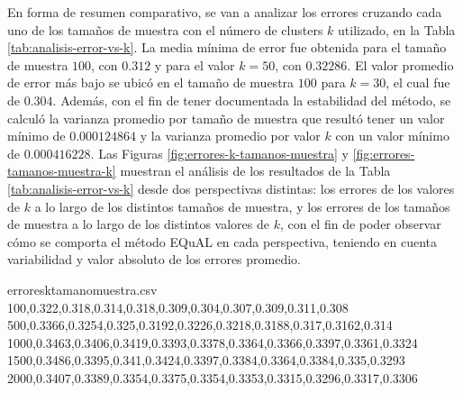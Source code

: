\bigskip En forma de resumen comparativo, se van a analizar los errores cruzando cada uno de los tamaños de muestra con el número de clusters \(k\) utilizado, en la Tabla \ref{tab:analisis-error-vs-k}. La media mínima de error fue obtenida para el tamaño de muestra \(100\), con \(0.312\) y para el valor \(k = 50\), con \(0.32286\). El valor promedio de error más bajo se ubicó en el tamaño de muestra \(100\) para \(k = 30\), el cual fue de \(0.304\). Además, con el fin de tener documentada la estabilidad del método, se calculó la varianza promedio por tamaño de muestra que resultó tener un valor mínimo de \(0.000124864\) y la varianza promedio por valor \(k\) con un valor mínimo de \(0.000416228\). Las Figuras \ref{fig:errores-k-tamanos-muestra} y \ref{fig:errores-tamanos-muestra-k} muestran el análisis de los resultados de la Tabla \ref{tab:analisis-error-vs-k} desde dos perspectivas distintas: los errores de los valores de \(k\) a lo largo de los distintos tamaños de muestra, y los errores de los tamaños de muestra a lo largo de los distintos valores de \(k\), con el fin de poder observar cómo se comporta el método EQuAL en cada perspectiva, teniendo en cuenta variabilidad y valor absoluto de los errores promedio.

\begin{filecontents*}{erroresktamanomuestra.csv}
100,0.322,0.318,0.314,0.318,0.309,0.304,0.307,0.309,0.311,0.308
500,0.3366,0.3254,0.325,0.3192,0.3226,0.3218,0.3188,0.317,0.3162,0.314
1000,0.3463,0.3406,0.3419,0.3393,0.3378,0.3364,0.3366,0.3397,0.3361,0.3324
1500,0.3486,0.3395,0.341,0.3424,0.3397,0.3384,0.3364,0.3384,0.335,0.3293
2000,0.3407,0.3389,0.3354,0.3375,0.3354,0.3353,0.3315,0.3296,0.3317,0.3306
\end{filecontents*}

